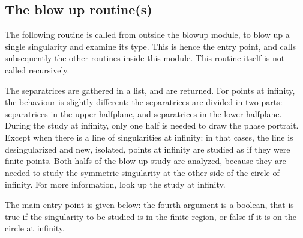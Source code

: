 \documentclass[a4paper,10pt]{article}
\begin{document}
\subsection{The blow up routine(s)}

The following routine is called from outside the blowup module, to blow up a single singularity
and examine its type.  This is hence the entry point, and calls subsequently the other routines inside
this module.  This routine itself is not called recursively.
\medskip

The separatrices are gathered in a list, and are returned.  For points at infinity, the behaviour
is slightly different: the separatrices are divided in two parts: separatrices in the upper halfplane,
and separatrices in the lower halfplane.  During the study at infinity, only one half is needed
to draw the phase portrait.  Except when there is a line of singularities at infinity: in that
cases, the line is desingularized and new, isolated, points at infinity are studied as if they were
finite points.  Both halfs of the blow up study are analyzed, because they are needed to study
the symmetric singularity at the other side of the circle of infinity.  For more information, look up the
study at infinity.

The main entry point is given below: the fourth argument is a boolean, that is true if the singularity
to be studied is in the finite region, or false if it is on the circle at infinity.
\end{document}
